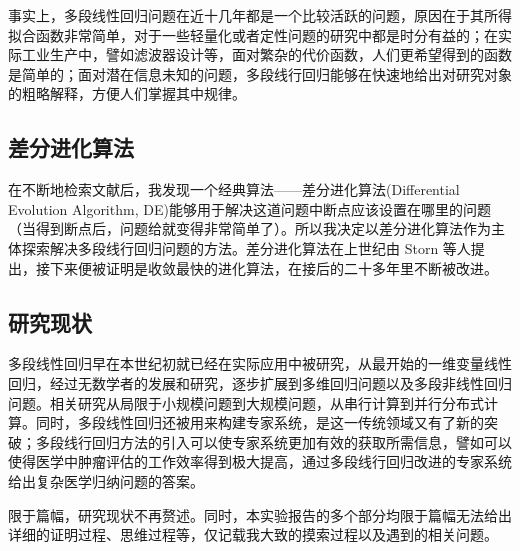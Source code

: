 事实上，多段线性回归问题在近十几年都是一个比较活跃的问题，原因在于其所得拟合函数非常简单，对于一些轻量化或者定性问题的研究中都是时分有益的；在实际工业生产中，譬如滤波器设计等，面对繁杂的代价函数，人们更希望得到的函数是简单的；面对潜在信息未知的问题，多段线行回归能够在快速地给出对研究对象的粗略解释，方便人们掌握其中规律。


\subsection{差分进化算法}

在不断地检索文献后，我发现一个经典算法——差分进化算法(Differential Evolution Algorithm, DE)能够用于解决这道问题中断点应该设置在哪里的问题（当得到断点后，问题给就变得非常简单了）。所以我决定以差分进化算法作为主体探索解决多段线行回归问题的方法。差分进化算法在上世纪由 Storn 等人提出，接下来便被证明是收敛最快的进化算法，在接后的二十多年里不断被改进。


\subsection{研究现状}

多段线性回归早在本世纪初就已经在实际应用中被研究，从最开始的一维变量线性回归，经过无数学者的发展和研究，逐步扩展到多维回归问题以及多段非线性回归问题。相关研究从局限于小规模问题到大规模问题，从串行计算到并行分布式计算。同时，多段线性回归还被用来构建专家系统，是这一传统领域又有了新的突破；多段线行回归方法的引入可以使专家系统更加有效的获取所需信息，譬如可以使得医学中肿瘤评估的工作效率得到极大提高，通过多段线行回归改进的专家系统给出复杂医学归纳问题的答案。

限于篇幅，研究现状不再赘述。同时，本实验报告的多个部分均限于篇幅无法给出详细的证明过程、思维过程等，仅记载我大致的摸索过程以及遇到的相关问题。




